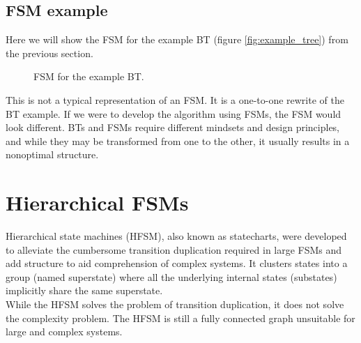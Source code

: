     \subsection{FSM example}
        Here we will show the FSM for the example BT (figure \ref{fig:example_tree}) from the previous section.
        \begin{figure}[H]
            \caption{FSM for the example BT.}
            \label{fig:example_fsm}
        \end{figure}
        This is not a typical representation of an FSM. It is a one-to-one rewrite of the BT example. If we were to develop the algorithm using FSMs, the FSM would look different. BTs and FSMs require different mindsets and design principles, and while they may be transformed from one to the other, it usually results in a nonoptimal structure.

\section{Hierarchical FSMs}
    Hierarchical state machines (HFSM), also known as statecharts, were developed to alleviate the cumbersome transition duplication required in large FSMs and add structure to aid comprehension of complex systems. It clusters states into a group (named superstate) where all the underlying internal states (substates) implicitly share the same superstate.\cite{BT_driving}\\
    While the HFSM solves the problem of transition duplication, it does not solve the complexity problem. The HFSM is still a fully connected graph unsuitable for large and complex systems.
    